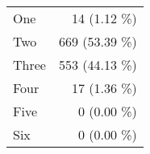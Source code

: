 \begin{tabular}{ l  r }
One & 14 (1.12 \%)\\
Two & 669 (53.39 \%)\\
Three & 553 (44.13 \%)\\
Four & 17 (1.36 \%)\\
Five & 0 (0.00 \%)\\
Six & 0 (0.00 \%)\\
\end{tabular}